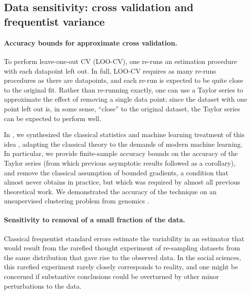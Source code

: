 \subsection*{Data sensitivity: cross validation and frequentist variance}


\paragraph{Accuracy bounds for approximate cross validation.}

To perform leave-one-out CV (LOO-CV), one re-runs an estimation procedure with
each datapoint left out.  In full, LOO-CV requires as many re-runs procedures as
there are datapoints, and each re-run is expected to be quite close to the
original fit.  Rather than re-running exactly, one can use a Taylor series to
approximate the effect of removing a single data point; since the dataset with
one point left out is, in some sense, ``close'' to the original dataset, the
Taylor series can be expected to perform well.

In \citet{giordano:2019:ij}, we synthesized the classical statistics and machine
learning treatment of this idea \citep{jaeckel:1972:infinitesimal,
shao:2012:jackknife, rad:2018:scalableloo, koh:2017:blackbox}, adapting the
classical theory to the demands of modern machine learning.  In particular, we
provide finite-sample accuracy bounds on the accuracy of the Taylor series (from
which previous asymptotic results followed as a corollary), and remove the
classical assumption of bounded gradients, a condition that almost never obtains
in practice, but which was required by almost all previous theoretical work. We
demonstrated the accuracy of the technique on an unsupervised clustering problem
from genomics \citep{shoemaker:2015:ultrasensitive}.


\paragraph{Sensitivity to removal of a small fraction of the data.} Classical
frequentist standard errors estimate the variability in an estimator that would
result from the rarefied thought experiment of re-sampling datasets from the same
distribution that gave rise to the observed data.  In the social sciences, this
rarefied experiment rarely closely corresponds to reality, and one might be
concerned if substantive conclusions could be overturned by other minor
perturbations to the data.

